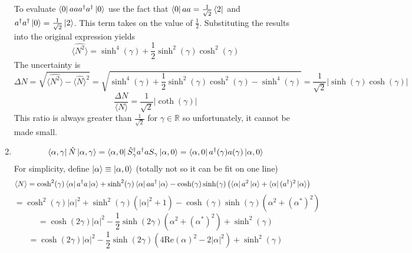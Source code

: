 \begin{sol}
\begin{enumerate}[label=\textbf{(\alph*)}]
\\\\To evaluate $\bra0aaa^\dagger a^\dagger\ket0$ use the fact that $\bra0 aa=\frac{1}{\sqrt{2}}\bra2$ and $a^\dagger a^\dagger\ket0=\frac{1}{\sqrt{2}}\ket2$. This term takes on the value of $\frac{1}{2}$. Substituting the results into the original expression yields
\begin{equation}
	\langle\hat {N^2}\rangle=\sinh^4(\gamma)+\frac{1}{2}\sinh^2(\gamma)\cosh^2(\gamma)
\end{equation}
The uncertainty is
\begin{equation}
	\Delta N=\sqrt{\langle \hat {N^2}\rangle-\langle \hat N\rangle^2}=\sqrt{\sinh^4(\gamma)+\frac{1}{2}\sinh^2(\gamma)\cosh^2(\gamma)-\sinh^4(\gamma)}=\frac{1}{\sqrt{2}}|\sinh(\gamma)\cosh(\gamma)|
\end{equation}
\begin{equation}
	\frac{\Delta N}{\langle N\rangle}=\frac{1}{\sqrt{2}}|\coth(\gamma)|
\end{equation} 
This ratio is always greater than $\frac{1}{\sqrt{2}}$ for $\gamma\in\mathbb R$ so unfortunately, it cannot be made small.
\item
\begin{equation}
	\bra{\alpha,\gamma}\hat N\ket{\alpha,\gamma}=\bra{\alpha,0}\hat S_\gamma^\dagger a^\dagger aS_\gamma\ket{\alpha,0}=\bra{\alpha,0}a^\dagger(\gamma)a(\gamma)\ket{\alpha,0}
\end{equation} 
For simplicity, define $\ket\alpha\equiv\ket{\alpha,0}$ (totally not so it can be fit on one line)
\begin{equation}
	\langle N\rangle=\cosh^2(\gamma)\bra\alpha a^\dagger a\ket\alpha+\sinh^2(\gamma)\bra\alpha aa^\dagger\ket\alpha-\cosh(\gamma)\sinh(\gamma)\left(\bra\alpha a^2\ket\alpha+\bra\alpha (a^\dagger)^2\ket\alpha\right)
\end{equation}   
\begin{equation}
	=\cosh^2(\gamma)|\alpha|^2+\sinh^2(\gamma)(|\alpha|^2+1)-\cosh(\gamma)\sinh(\gamma)(\alpha^2+(\alpha^*)^2)
\end{equation}
\begin{equation}
	=\cosh(2\gamma)|\alpha|^2-\frac{1}{2}\sinh(2\gamma)(\alpha^2+(\alpha^*)^2)+\sinh^2(\gamma)
\end{equation}
\begin{equation}
	=\cosh(2\gamma)|\alpha|^2-\frac{1}{2}\sinh(2\gamma)(4\text{Re}(\alpha)^2-2|\alpha|^2)+\sinh^2(\gamma)
\end{equation}
\begin{equation}

\end{equation}
\end{enumerate}
\end{sol}
